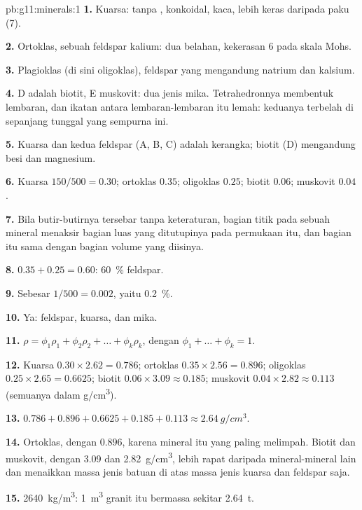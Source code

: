 \begin{solution}{pb:g11:minerals:1}
\textbf{1.} Kuarsa: tanpa ,  konkoidal,  kaca, lebih keras
daripada paku (7).

\textbf{2.} Ortoklas, sebuah feldspar kalium: dua belahan, kekerasan 6 pada
skala Mohs.

\textbf{3.} Plagioklas (di sini oligoklas), feldspar yang mengandung natrium dan
kalsium.

\textbf{4.} D adalah biotit, E muskovit: dua jenis mika. Tetrahedronnya membentuk
lembaran, dan ikatan antara lembaran-lembaran itu lemah: keduanya terbelah di
sepanjang  tunggal yang sempurna ini.

\textbf{5.} Kuarsa dan kedua feldspar (A, B, C) adalah kerangka; biotit
(D) mengandung besi dan magnesium.

\textbf{6.} Kuarsa $150/500 = 0.30$; ortoklas $0.35$; oligoklas $0.25$;
biotit $0.06$; muskovit $0.04$.

\textbf{7.} Bila butir-butirnya tersebar tanpa keteraturan, bagian titik pada
sebuah mineral menaksir bagian luas yang ditutupinya pada permukaan itu, dan
bagian itu sama dengan bagian volume yang diisinya.

\textbf{8.} $0.35 + 0.25 = 0.60$: \qty{60}{\percent} feldspar.

\textbf{9.} Sebesar $1/500 = 0.002$, yaitu \qty{0.2}{\percent}.

\textbf{10.} Ya: feldspar, kuarsa, dan mika.

\textbf{11.} $\rho = \phi_1 \rho_1 + \phi_2 \rho_2 + \dots + \phi_k \rho_k$,
dengan $\phi_1 + \dots + \phi_k = 1$.

\textbf{12.} Kuarsa $0.30 \times 2.62 = 0.786$; ortoklas $0.35 \times 2.56 =
0.896$; oligoklas $0.25 \times 2.65 = 0.6625$; biotit $0.06 \times 3.09
\approx 0.185$; muskovit $0.04 \times 2.82 \approx 0.113$ (semuanya dalam
\unit{g/cm^3}).

\textbf{13.} $0.786 + 0.896 + 0.6625 + 0.185 + 0.113 \approx
\qty{2.64}{g/cm^3}$.

\textbf{14.} Ortoklas, dengan $0.896$, karena mineral itu yang paling melimpah.
Biotit dan muskovit, dengan \qty{3.09}{} dan \qty{2.82}{g/cm^3}, lebih rapat
daripada mineral-mineral lain dan menaikkan massa jenis batuan di atas massa jenis
kuarsa dan feldspar saja.

\textbf{15.} \qty{2640}{kg/m^3}: \qty{1}{m^3} granit itu bermassa
sekitar \qty{2.64}{t}.


\end{solution}
